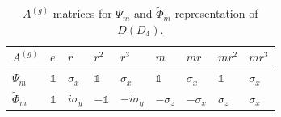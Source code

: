 \documentclass[two column]{article}
\begin{document}
\begin{table}[]
    \centering
    \begin{tabular}{|p{0.5cm}||p{0.25cm}|p{0.5cm}|p{0.5cm}|p{0.6cm}|p{0.5cm}|p{0.5cm}|p{0.5cm}|p{0.5cm}|}
    \hline
  $A^{(g)}$ & $e$ &   $r$ & $r^2$ & $r^3$ &  $m$ & $mr$ & $mr^2$ & $mr^3$ \\
\hline\hline
 $\Psi_{m}$ &$\mathbb{1}$&  $\sigma_x$ & $\mathbb{1}$&  $\sigma_x$ & $\mathbb{1}$& $\sigma_x$ &  $\mathbb{1}$&   $\sigma_x$ \\\hline
 $\tilde{\Phi}_{m}$ &$\mathbb{1}$&$i\sigma_y$ &$-\mathbb{1}$& $-i\sigma_y$ &$-\sigma_z$ &$-\sigma_x$ &  $\sigma_z$ &   $\sigma_x$ \\\hline
\end{tabular}
    \caption{$A^{(g)}$ matrices for $\Psi_m$ and $\tilde{\Phi}_m$ representation of $D(D_4)$.}
    \label{tab:somereps}
\end{table}
%
%
\end{document}
